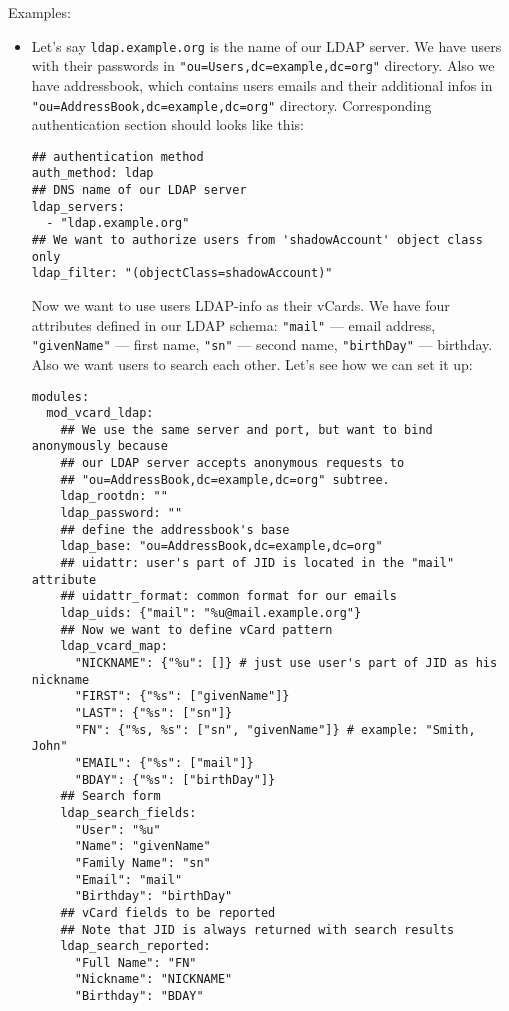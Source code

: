 \documentclass[a4paper,10pt]{book}
\newcommand{\term}[1]{\texttt{#1}}
\begin{document}
Examples:
\begin{itemize}
\item

Let's say \term{ldap.example.org} is the name of our LDAP server. We have
users with their passwords in \term{"ou=Users,dc=example,dc=org"} directory.
Also we have addressbook, which contains users emails and their additional
infos in \term{"ou=AddressBook,dc=example,dc=org"} directory.  Corresponding
authentication section should looks like this:

\begin{verbatim}
## authentication method
auth_method: ldap
## DNS name of our LDAP server
ldap_servers:
  - "ldap.example.org"
## We want to authorize users from 'shadowAccount' object class only
ldap_filter: "(objectClass=shadowAccount)"
\end{verbatim}

Now we want to use users LDAP-info as their vCards. We have four attributes
defined in our LDAP schema: \term{"mail"} --- email address, \term{"givenName"}
--- first name, \term{"sn"} --- second name, \term{"birthDay"} --- birthday.
Also we want users to search each other. Let's see how we can set it up:

\begin{verbatim}
modules:
  mod_vcard_ldap:
    ## We use the same server and port, but want to bind anonymously because
    ## our LDAP server accepts anonymous requests to
    ## "ou=AddressBook,dc=example,dc=org" subtree.
    ldap_rootdn: ""
    ldap_password: ""
    ## define the addressbook's base
    ldap_base: "ou=AddressBook,dc=example,dc=org"
    ## uidattr: user's part of JID is located in the "mail" attribute
    ## uidattr_format: common format for our emails
    ldap_uids: {"mail": "%u@mail.example.org"}
    ## Now we want to define vCard pattern
    ldap_vcard_map:
      "NICKNAME": {"%u": []} # just use user's part of JID as his nickname
      "FIRST": {"%s": ["givenName"]}
      "LAST": {"%s": ["sn"]}
      "FN": {"%s, %s": ["sn", "givenName"]} # example: "Smith, John"
      "EMAIL": {"%s": ["mail"]}
      "BDAY": {"%s": ["birthDay"]}
    ## Search form
    ldap_search_fields:
      "User": "%u"
      "Name": "givenName"
      "Family Name": "sn"
      "Email": "mail"
      "Birthday": "birthDay"
    ## vCard fields to be reported
    ## Note that JID is always returned with search results
    ldap_search_reported:
      "Full Name": "FN"
      "Nickname": "NICKNAME"
      "Birthday": "BDAY"
\end{verbatim}


\end{itemize}
\end{document}
